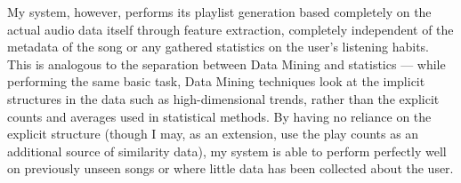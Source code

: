 My system, however, performs its playlist generation based completely on the actual audio data itself through feature extraction, completely independent of the metadata of the song or any gathered statistics on the user's listening habits. This is analogous to the separation between Data Mining and statistics --- while performing the same basic task, Data Mining techniques look at the implicit structures in the data such as high-dimensional trends, rather than the explicit counts and averages used in statistical methods. By having no reliance on the explicit structure (though I may, as an extension, use the play counts as an additional source of similarity data), my system is able to perform perfectly well on previously unseen songs or where little data has been collected about the user.

